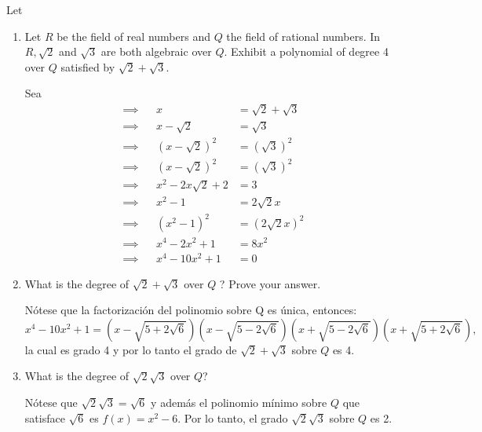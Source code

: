 \begin{problema}[Problema 4]
    Let 
    \begin{enumerate}
        \item Let $R$ be the field of real numbers and $Q$ the field of rational numbers. In $R, \sqrt{2}$ and $\sqrt{3}$ are both algebraic over $Q$. Exhibit a polynomial of degree 4 over $Q$ satisfied by $\sqrt{2}+\sqrt{3}$.
        \begin{sol}
            Sea 
            \begin{align*}
                \implies& &x &= \sqrt{2}+\sqrt{3}\\
                \implies& &x-\sqrt{2} &= \sqrt{3}\\
                \implies& &(x-\sqrt{2})^2 &= (\sqrt{3})^2\\
                \implies& &(x-\sqrt{2})^2 &= (\sqrt{3})^2\\
                \implies& &x^2-2x\sqrt{2}+2 &= 3\\
                \implies& &x^2-1 &= 2\sqrt{2}x\\
                \implies& &(x^2-1)^2 &= (2\sqrt{2}x)^2\\
                \implies& &x^4-2x^2+1 &= 8x^2\\
                \implies& &x^4-10x^2+1 &= 0
            \end{align*}
        \end{sol}
        \item What is the degree of $\sqrt{2}+\sqrt{3}$ over $Q$ ? Prove your answer.
        \begin{sol}
            Nótese que la factorización del polinomio sobre Q es única, entonces:
            $$x^4-10x^2+1 = \left(x-\sqrt{5+2\sqrt{6}}\right) \left(x-\sqrt{5-2\sqrt{6}}\right) \left(x+\sqrt{5-2\sqrt{6}}\right) \left(x+\sqrt{5+2\sqrt{6}}\right),$$
            la cual es grado 4 y por lo tanto el grado de $\sqrt{2}+\sqrt{3}$ sobre $Q$ es 4. 
        \end{sol}
        \item What is the degree of $\sqrt{2} \sqrt{3}$ over $Q$?
        \begin{sol}
            Nótese que $\sqrt{2}\sqrt{3}=\sqrt{6}$ y además el polinomio mínimo sobre $Q$ que satisface $\sqrt{6}$ es $f(x)=x^2-6$. Por lo tanto, el grado $\sqrt{2} \sqrt{3}$ sobre $Q$ es 2. 
        \end{sol}
    \end{enumerate}
\end{problema}

